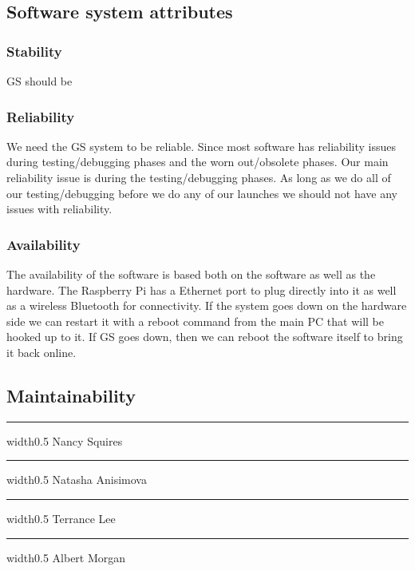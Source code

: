\documentclass[10pt,draftclsnofoot,onecolumn]{IEEEtran}
\newcommand{\sigline}[1][\empty] {
	\vspace{1in}
	\hrule width0.5\textwidth
	\vspace{1mm}
	\noindent #1	
}
\begin{document}
	\subsection{Software system attributes}

	\subsubsection{Stability}
	GS should be 

	\subsubsection{Reliability}
	We need the GS system to be reliable.  Since most software has reliability issues
	during testing/debugging phases and the worn out/obsolete phases.  Our main reliability
	issue is during the testing/debugging phases. As long as we do all of our testing/debugging
	before we do any of our launches we should not have any issues with reliability. 

	\subsubsection{Availability}
	The availability of the software is based both on the software as well as the 
	hardware. The Raspberry Pi has a Ethernet port to plug directly into it as well as
	a wireless Bluetooth for connectivity. If the system goes down on the hardware side
	we can restart it with a reboot command from the main PC that will be hooked up to it.
	If GS goes down, then we can reboot the software itself to bring it back online. 
	
\subsection{Maintainability}

\printindex

\begin{minipage}{\textwidth}
	
	\sigline{Nancy Squires}
	\sigline{Natasha Anisimova}
	\sigline{Terrance Lee}
	\sigline{Albert Morgan}\\
	
\end{minipage}
\end{document}
